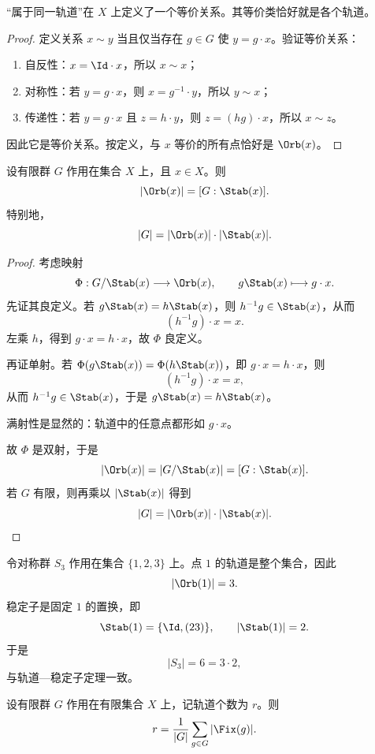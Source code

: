 \begin{proposition}
“属于同一轨道”在 $X$ 上定义了一个等价关系。其等价类恰好就是各个轨道。
\end{proposition}

\begin{proof}
定义关系 $x\sim y$ 当且仅当存在 $g\in G$ 使 $y=g\cdot x$。验证等价关系：
\begin{enumerate}
  \item 自反性：$x=\Id\cdot x$，所以 $x\sim x$；
  \item 对称性：若 $y=g\cdot x$，则 $x=g^{-1}\cdot y$，所以 $y\sim x$；
  \item 传递性：若 $y=g\cdot x$ 且 $z=h\cdot y$，则 $z=(hg)\cdot x$，所以 $x\sim z$。
\end{enumerate}
因此它是等价关系。按定义，与 $x$ 等价的所有点恰好是 $\Orb(x)$。
\end{proof}

\begin{theorem}[轨道—稳定子定理]
设有限群 $G$ 作用在集合 $X$ 上，且 $x\in X$。则
\[
|\Orb(x)|=[G:\Stab(x)].
\]
特别地，
\[
|G|=|\Orb(x)|\cdot |\Stab(x)|.
\]
\end{theorem}

\begin{proof}
考虑映射
\[
\Phi:G/\Stab(x)\longrightarrow \Orb(x),
\qquad g\Stab(x)\longmapsto g\cdot x.
\]
先证其良定义。若 $g\Stab(x)=h\Stab(x)$，则 $h^{-1}g\in \Stab(x)$，从而
\[
(h^{-1}g)\cdot x=x.
\]
左乘 $h$，得到 $g\cdot x=h\cdot x$，故 $\Phi$ 良定义。

再证单射。若 $\Phi(g\Stab(x))=\Phi(h\Stab(x))$，即 $g\cdot x=h\cdot x$，则
\[
(h^{-1}g)\cdot x=x,
\]
从而 $h^{-1}g\in \Stab(x)$，于是 $g\Stab(x)=h\Stab(x)$。

满射性是显然的：轨道中的任意点都形如 $g\cdot x$。

故 $\Phi$ 是双射，于是
\[
|\Orb(x)|=|G/\Stab(x)|=[G:\Stab(x)].
\]
若 $G$ 有限，则再乘以 $|\Stab(x)|$ 得到
\[
|G|=|\Orb(x)|\cdot |\Stab(x)|.
\]
\end{proof}

\begin{example}
令对称群 $S_3$ 作用在集合 $\{1,2,3\}$ 上。点 $1$ 的轨道是整个集合，因此
\[
|\Orb(1)|=3.
\]
稳定子是固定 $1$ 的置换，即
\[
\Stab(1)=\{\Id,(23)\},
\qquad |\Stab(1)|=2.
\]
于是
\[
|S_3|=6=3\cdot 2,
\]
与轨道—稳定子定理一致。
\end{example}

\begin{theorem}[Burnside 引理]
设有限群 $G$ 作用在有限集合 $X$ 上，记轨道个数为 $r$。则
\[
r=\frac{1}{|G|}\sum_{g\in G}|\Fix(g)|.
\]
\end{theorem}

